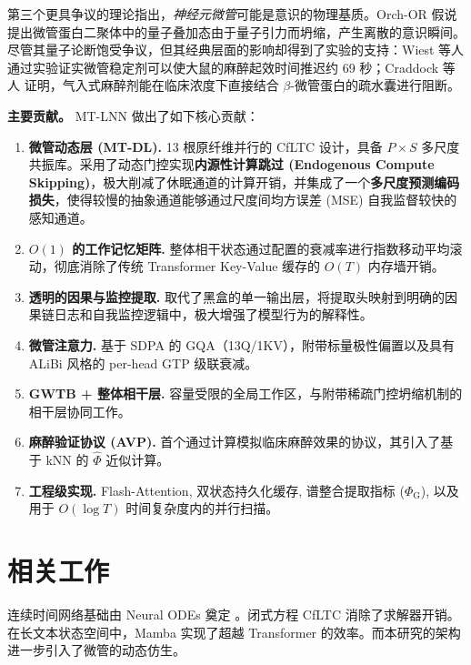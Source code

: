 \documentclass[11pt]{article}
\theoremstyle{definition}
\begin{document}
第三个更具争议的理论指出，\emph{神经元微管}可能是意识的物理基质。Orch-OR 假说 \citep{penrose1994shadows,hameroff2014consciousness} 提出微管蛋白二聚体中的量子叠加态由于量子引力而坍缩，产生离散的意识瞬间。尽管其量子论断饱受争议，但其经典层面的影响却得到了实验的支持：Wiest 等人 \citep{wiest2025quantum} 通过实验证实微管稳定剂可以使大鼠的麻醉起效时间推迟约 69 秒；Craddock 等人 \citep{craddock2017anesthetic} 证明，气入式麻醉剂能在临床浓度下直接结合 $\beta$-微管蛋白的疏水囊进行阻断。

\medskip\noindent\textbf{主要贡献。} MT-LNN 做出了如下核心贡献：
\begin{enumerate}[label=\textbf{C\arabic*},leftmargin=*]
  \item \textbf{微管动态层 (MT-DL).} 13 根原纤维并行的 CfLTC 设计，具备 $P\!\times\!S$ 多尺度共振库。采用了动态门控实现\textbf{内源性计算跳过 (Endogenous Compute Skipping)}，极大削减了休眠通道的计算开销，并集成了一个\textbf{多尺度预测编码损失}，使得较慢的抽象通道能够通过尺度间均方误差 (MSE) 自我监督较快的感知通道。
  \item \textbf{$O(1)$ 的工作记忆矩阵.} 整体相干状态通过配置的衰减率进行指数移动平均滚动，彻底消除了传统 Transformer Key-Value 缓存的 $O(T)$ 内存墙开销。
  \item \textbf{透明的因果与监控提取.} 取代了黑盒的单一输出层，将提取头映射到明确的因果链日志和自我监控逻辑中，极大增强了模型行为的解释性。
  \item \textbf{微管注意力.} 基于 SDPA 的 GQA（13Q/1KV），附带标量极性偏置以及具有 ALiBi 风格的 per-head GTP 级联衰减。
  \item \textbf{GWTB + 整体相干层.} 容量受限的全局工作区，与附带稀疏门控坍缩机制的相干层协同工作。
  \item \textbf{麻醉验证协议 (AVP).} 首个通过计算模拟临床麻醉效果的协议，其引入了基于 kNN 的 $\hat{\Phi}$ 近似计算。
  \item \textbf{工程级实现.} Flash-Attention, 双状态持久化缓存, 谱整合提取指标 ($\Phi_{\mathrm{G}}$), 以及用于 $O(\log T)$ 时间复杂度内的并行扫描。
\end{enumerate}

\section{相关工作}
\label{sec:related}

连续时间网络基础由 Neural ODEs 奠定 \citep{chen2018neural}。闭式方程 CfLTC \citep{hasani2022closed} 消除了求解器开销。在长文本状态空间中，Mamba \citep{gu2023mamba} 实现了超越 Transformer 的效率。而本研究的架构进一步引入了微管的动态仿生。
\end{document}

